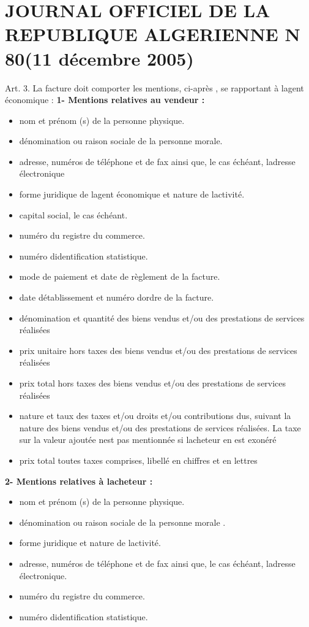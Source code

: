 \documentclass[edit,12pt,a4paper,ChapStyle,oneside,doubleinterligne]{report}
\begin{document}
\section*{JOURNAL OFFICIEL DE LA  REPUBLIQUE ALGERIENNE N 80(11 décembre 2005)}
  Art. 3.  La facture doit comporter les  mentions, ci-après ,  se  rapportant  à  lagent  économique :
\newline\textbf{1- Mentions relatives au vendeur :}
\begin{itemize}
    \item nom et prénom  (s)  de la personne physique.
    \item dénomination ou raison sociale de la personne morale.
    \item adresse, numéros de téléphone et de fax ainsi que, le cas échéant, ladresse électronique
    \item forme juridique de lagent économique et nature de lactivité.
    \item capital social, le cas échéant.
    \item numéro du registre du commerce.
    \item numéro didentification statistique.
    \item mode de paiement et date  de  règlement de la facture.
    \item date détablissement  et  numéro dordre de la facture.
    \item dénomination  et  quantité  des   biens  vendus   et/ou
    des   prestations  de services  réalisées
    \item prix  unitaire  hors  taxes   des   biens   vendus    et/ou
    des  prestations  de  services réalisées
    \item prix total hors  taxes  des  biens  vendus  et/ou  des
    prestations  de  services réalisées
    \item nature  et   taux   des   taxes   et/ou  droits et/ou
    contributions   dus,  suivant la nature  des  biens  vendus
    et/ou  des prestations de services réalisées.  La taxe   sur
    la   valeur   ajoutée   nest    pas   mentionnée  si lacheteur
    en est exonéré
    \item prix total toutes taxes comprises, libellé en chiffres
    et en lettres
\end{itemize}
\textbf{2- Mentions relatives à lacheteur :}
\begin{itemize}
    \item nom et prénom (s) de la personne physique.
    \item dénomination ou raison sociale de la personne
    morale .
    \item forme juridique et nature de lactivité.
    \item adresse, numéros de téléphone et de fax  ainsi  que,
    le cas échéant, ladresse électronique.
    \item numéro du registre du commerce.
    \item numéro didentification statistique.
\end{itemize}
\end{document}
